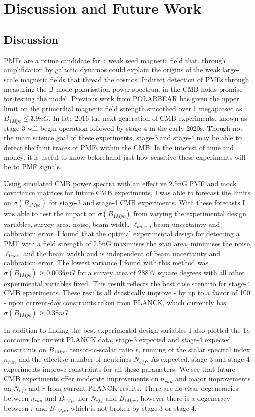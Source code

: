 \section{Discussion and Future Work}
\subsection{Discussion}

PMFs are a prime candidate for a weak seed magnetic field that, through amplification by galactic dynamos could explain the origins of the weak large-scale magnetic fields that thread the cosmos. Indirect detection of PMFs through measuring the B-mode polarisation power spectrum in the CMB holds promise for testing the model. Previous work from POLARBEAR has given the upper limit on the primordial magnetic field strength smoothed over 1 megaparsec as $B_{1Mpc} \leq 3.9nG$. In late 2016 the next generation of CMB experiments, known as stage-3 will begin operation followed by stage-4 in the early 2020s. Though not the main science goal of these experiments, stage-3 and stage-4 may be able to detect the faint traces of PMFs within the CMB. In the interest of time and money, it is useful to know beforehand just how sensitive these experiments will be to PMF signals.

Using simulated CMB power spectra with an effective 2.5nG PMF and mock covariance matrices for future CMB experiments, I was able to forecast the limits on $\sigma(B_{1Mpc})$ for stage-3 and stage-4 CMB experiments. With these forecasts I was able to test the impact on $\sigma(B_{1Mpc})$ from varying the experimental design variables, survey area, noise, beam width, $\ell_{knee}$, beam uncertainty and calibration error. I found that the optimal experimental design for detecting a PMF with a field strength of 2.5nG maximises the scan area, minimises the noise, $\ell_{knee}$ and the beam width and is independent of beam uncertainty and calibration error. The lowest variance I found with this method was $\sigma(B_{1Mpc}) \geq 0.0036nG$ for a survey area of 28877 square degrees with all other experimental variables fixed. This result reflects the best case scenario for stage-4 CMB epxeriments. These results all drastically improve - by up to a factor of 100 - upon current-day constraints taken from PLANCK, which currently has $\sigma(B_{1Mpc}) \geq 0.38nG$.

In addition to finding the best experimental design variables I also plotted the 1$\sigma$ contours for current PLANCK data, stage-3 expected and stage-4 expected constraints on $B_{1Mpc}$, tensor-to-scalar ratio $r$, running of the scalar spectral index $n_{run}$ and the effective number of neutrinos $N_{eff}$. As expected, stage-3 and stage-4 experiments improve constraints for all these parameters. We see that future CMB experiments offer moderate improvements on $n_{run}$ and major improvements on $N_{eff}$ and $r$ from current PLANCK results. There are no clear degeneracies between $n_{run}$ and $B_{1Mpc}$ nor $N_{eff}$ and $B_{1Mpc}$, however there is a degeneracy between $r$ and $B_{1Mpc}$, which is not broken by stage-3 or stage-4.

